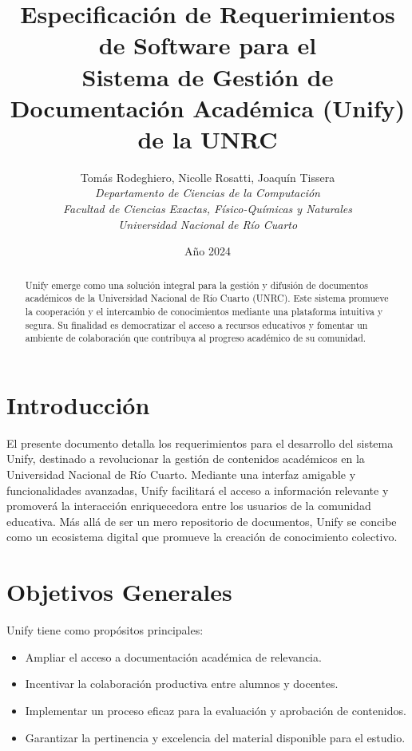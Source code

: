 \documentclass[10pt]{article}
\title{
  Especificación de Requerimientos de Software para el \\
  \textbf{Sistema de Gestión de Documentación Académica (Unify) de la UNRC}
}
\author{
  Tomás Rodeghiero, Nicolle Rosatti, Joaquín Tissera \\
  \textit{Departamento de Ciencias de la Computación} \\
  \textit{Facultad de Ciencias Exactas, Físico-Químicas y Naturales} \\\textit{Universidad Nacional de Río Cuarto}
}
\date{Año 2024}
\begin{document}
\maketitle

\begin{abstract}
Unify emerge como una solución integral para la gestión y difusión de documentos académicos de la Universidad Nacional de Río Cuarto (UNRC). Este sistema promueve la cooperación y el intercambio de conocimientos mediante una plataforma intuitiva y segura. Su finalidad es democratizar el acceso a recursos educativos y fomentar un ambiente de colaboración que contribuya al progreso académico de su comunidad.
\end{abstract}

\renewcommand{\thesection}{\Roman{section}}

\section{Introducción}
El presente documento detalla los requerimientos para el desarrollo del sistema Unify, destinado a revolucionar la gestión de contenidos académicos en la Universidad Nacional de Río Cuarto. Mediante una interfaz amigable y funcionalidades avanzadas, Unify facilitará el acceso a información relevante y promoverá la interacción enriquecedora entre los usuarios de la comunidad educativa. Más allá de ser un mero repositorio de documentos, Unify se concibe como un ecosistema digital que promueve la creación de conocimiento colectivo.

\section{Objetivos Generales}
Unify tiene como propósitos principales:
\begin{itemize}
  \item Ampliar el acceso a documentación académica de relevancia.
  \item Incentivar la colaboración productiva entre alumnos y docentes.
  \item Implementar un proceso eficaz para la evaluación y aprobación de contenidos.
  \item Garantizar la pertinencia y excelencia del material disponible para el estudio.
\end{itemize}
\end{document}
